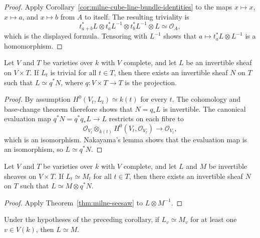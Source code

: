 \begin{proof}
Apply Corollary~\ref{cor:milne-cube-line-bundle-identities} to the maps
$x\mapsto x$, $x\mapsto a$, and $x\mapsto b$ from $A$ to itself.  The
resulting triviality is
\[
t_{a+b}^*L\otimes t_a^*L^{-1}\otimes t_b^*L^{-1}\otimes L\simeq\mathcal O_A,
\]
which is the displayed formula.  Tensoring with $L^{-1}$ shows that
$a\mapsto t_a^*L\otimes L^{-1}$ is a homomorphism.
\end{proof}

\begin{theorem}
\label{thm:milne-seesaw}

Let $V$ and $T$ be varieties over $k$ with $V$ complete, and let $L$ be an
invertible sheaf on $V\times T$.  If $L_t$ is trivial for all $t\in T$, then
there exists an invertible sheaf $N$ on $T$ such that
$L\simeq q^*N$, where $q:V\times T\to T$ is the projection.
\end{theorem}

\begin{proof}
By assumption $H^0(V_t,L_t)\simeq k(t)$ for every $t$.  The cohomology and
base-change theorem therefore shows that $N=q_*L$ is invertible.  The canonical
evaluation map $q^*N=q^*q_*L\to L$ restricts on each fibre to
\[
 \mathcal O_{V_t}\otimes_{k(t)}H^0(V_t,\mathcal O_{V_t})\longrightarrow
 \mathcal O_{V_t},
\]
which is an isomorphism.  Nakayama's lemma shows that the evaluation map is an
isomorphism, so $L\simeq q^*N$.
\end{proof}

\begin{corollary}
\label{cor:milne-seesaw-twist}

Let $V$ and $T$ be varieties over $k$ with $V$ complete, and let $L$ and $M$
be invertible sheaves on $V\times T$.  If $L_t\simeq M_t$ for all $t\in T$,
then there exists an invertible sheaf $N$ on $T$ such that
$L\simeq M\otimes q^*N$.
\end{corollary}

\begin{proof}
Apply Theorem~\ref{thm:milne-seesaw} to $L\otimes M^{-1}$.
\end{proof}

\begin{corollary}
\label{cor:milne-seesaw-principle}

Under the hypotheses of the preceding corollary, if $L_v\simeq M_v$ for at
least one $v\in V(k)$, then $L\simeq M$.
\end{corollary}

